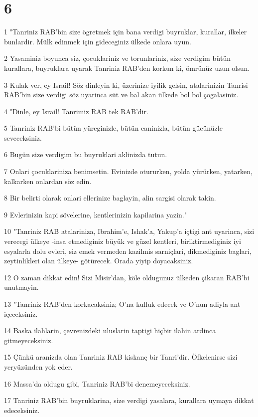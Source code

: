 \chapter{6}

\par 1 "Tanriniz RAB'bin size ögretmek için bana verdigi buyruklar, kurallar, ilkeler bunlardir. Mülk edinmek için gideceginiz ülkede onlara uyun.
\par 2 Yasaminiz boyunca siz, çocuklariniz ve torunlariniz, size verdigim bütün kurallara, buyruklara uyarak Tanriniz RAB'den korkun ki, ömrünüz uzun olsun.
\par 3 Kulak ver, ey Israil! Söz dinleyin ki, üzerinize iyilik gelsin, atalarinizin Tanrisi RAB'bin size verdigi söz uyarinca süt ve bal akan ülkede bol bol çogalasiniz.
\par 4 "Dinle, ey Israil! Tanrimiz RAB tek RAB'dir.
\par 5 Tanriniz RAB'bi bütün yüreginizle, bütün caninizla, bütün gücünüzle seveceksiniz.
\par 6 Bugün size verdigim bu buyruklari aklinizda tutun.
\par 7 Onlari çocuklariniza benimsetin. Evinizde otururken, yolda yürürken, yatarken, kalkarken onlardan söz edin.
\par 8 Bir belirti olarak onlari ellerinize baglayin, alin sargisi olarak takin.
\par 9 Evlerinizin kapi sövelerine, kentlerinizin kapilarina yazin."
\par 10 "Tanriniz RAB atalariniza, Ibrahim'e, Ishak'a, Yakup'a içtigi ant uyarinca, sizi verecegi ülkeye -insa etmediginiz büyük ve güzel kentleri, biriktirmediginiz iyi esyalarla dolu evleri, siz emek vermeden kazilmis sarniçlari, dikmediginiz baglari, zeytinlikleri olan ülkeye- götürecek. Orada yiyip doyacaksiniz.
\par 12 O zaman dikkat edin! Sizi Misir'dan, köle oldugunuz ülkeden çikaran RAB'bi unutmayin.
\par 13 "Tanriniz RAB'den korkacaksiniz; O'na kulluk edecek ve O'nun adiyla ant içeceksiniz.
\par 14 Baska ilahlarin, çevrenizdeki uluslarin taptigi hiçbir ilahin ardinca gitmeyeceksiniz.
\par 15 Çünkü aranizda olan Tanriniz RAB kiskanç bir Tanri'dir. Öfkelenirse sizi yeryüzünden yok eder.
\par 16 Massa'da oldugu gibi, Tanriniz RAB'bi denemeyeceksiniz.
\par 17 Tanriniz RAB'bin buyruklarina, size verdigi yasalara, kurallara uymaya dikkat edeceksiniz.
